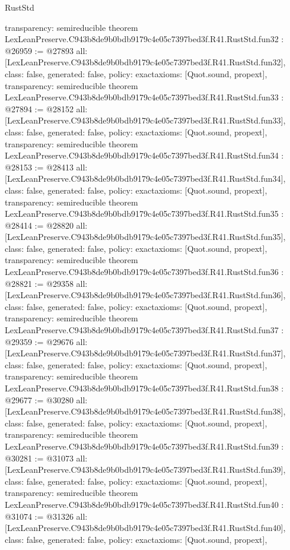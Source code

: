 \begin{lexlean}{RustStd}
\begin{coremodule}
{  transparency: semireducible
}
theorem LexLeanPreserve.C943b8de9b0bdb9179c4e05c7397bed3f.R41.RustStd.fun32 : @26959 := @27893 {
  all: [LexLeanPreserve.C943b8de9b0bdb9179c4e05c7397bed3f.R41.RustStd.fun32],
  class: false,
  generated: false,
  policy: exact{axioms: [Quot.sound, propext]},
  transparency: semireducible
}
theorem LexLeanPreserve.C943b8de9b0bdb9179c4e05c7397bed3f.R41.RustStd.fun33 : @27894 := @28152 {
  all: [LexLeanPreserve.C943b8de9b0bdb9179c4e05c7397bed3f.R41.RustStd.fun33],
  class: false,
  generated: false,
  policy: exact{axioms: [Quot.sound, propext]},
  transparency: semireducible
}
theorem LexLeanPreserve.C943b8de9b0bdb9179c4e05c7397bed3f.R41.RustStd.fun34 : @28153 := @28413 {
  all: [LexLeanPreserve.C943b8de9b0bdb9179c4e05c7397bed3f.R41.RustStd.fun34],
  class: false,
  generated: false,
  policy: exact{axioms: [Quot.sound, propext]},
  transparency: semireducible
}
theorem LexLeanPreserve.C943b8de9b0bdb9179c4e05c7397bed3f.R41.RustStd.fun35 : @28414 := @28820 {
  all: [LexLeanPreserve.C943b8de9b0bdb9179c4e05c7397bed3f.R41.RustStd.fun35],
  class: false,
  generated: false,
  policy: exact{axioms: [Quot.sound, propext]},
  transparency: semireducible
}
theorem LexLeanPreserve.C943b8de9b0bdb9179c4e05c7397bed3f.R41.RustStd.fun36 : @28821 := @29358 {
  all: [LexLeanPreserve.C943b8de9b0bdb9179c4e05c7397bed3f.R41.RustStd.fun36],
  class: false,
  generated: false,
  policy: exact{axioms: [Quot.sound, propext]},
  transparency: semireducible
}
theorem LexLeanPreserve.C943b8de9b0bdb9179c4e05c7397bed3f.R41.RustStd.fun37 : @29359 := @29676 {
  all: [LexLeanPreserve.C943b8de9b0bdb9179c4e05c7397bed3f.R41.RustStd.fun37],
  class: false,
  generated: false,
  policy: exact{axioms: [Quot.sound, propext]},
  transparency: semireducible
}
theorem LexLeanPreserve.C943b8de9b0bdb9179c4e05c7397bed3f.R41.RustStd.fun38 : @29677 := @30280 {
  all: [LexLeanPreserve.C943b8de9b0bdb9179c4e05c7397bed3f.R41.RustStd.fun38],
  class: false,
  generated: false,
  policy: exact{axioms: [Quot.sound, propext]},
  transparency: semireducible
}
theorem LexLeanPreserve.C943b8de9b0bdb9179c4e05c7397bed3f.R41.RustStd.fun39 : @30281 := @31073 {
  all: [LexLeanPreserve.C943b8de9b0bdb9179c4e05c7397bed3f.R41.RustStd.fun39],
  class: false,
  generated: false,
  policy: exact{axioms: [Quot.sound, propext]},
  transparency: semireducible
}
theorem LexLeanPreserve.C943b8de9b0bdb9179c4e05c7397bed3f.R41.RustStd.fun40 : @31074 := @31326 {
  all: [LexLeanPreserve.C943b8de9b0bdb9179c4e05c7397bed3f.R41.RustStd.fun40],
  class: false,
  generated: false,
  policy: exact{axioms: [Quot.sound, propext]},
}
\end{coremodule}
\end{lexlean}

